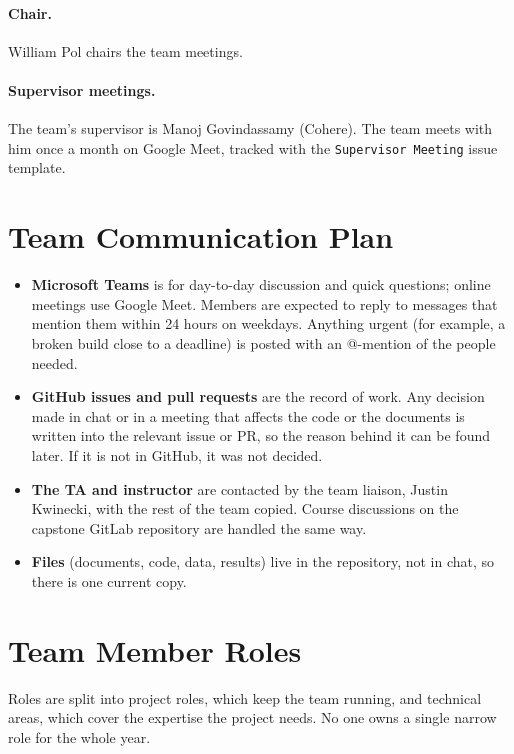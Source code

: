 \documentclass{article}
\begin{document}
\paragraph{Chair.} William Pol chairs the team meetings.

\paragraph{Supervisor meetings.} The team's supervisor is Manoj
Govindassamy (Cohere). The team meets with him once a month on Google
Meet, tracked with the \texttt{Supervisor Meeting} issue template.

\section{Team Communication Plan}

\begin{itemize}
  \item \textbf{Microsoft Teams} is for day-to-day discussion and quick
  questions; online meetings use Google Meet. Members are expected to reply to
  messages that mention them within 24 hours on weekdays. Anything urgent
  (for example, a broken build close to a deadline) is posted with an
  @-mention of the people needed.
  \item \textbf{GitHub issues and pull requests} are the record of work.
  Any decision made in chat or in a meeting that affects the code or the
  documents is written into the relevant issue or PR, so the reason
  behind it can be found later. If it is not in GitHub, it was not
  decided.
  \item \textbf{The TA and instructor} are contacted by the team liaison,
  Justin Kwinecki, with the rest of the team copied. Course discussions on
  the capstone GitLab repository are handled the same way.
  \item \textbf{Files} (documents, code, data, results) live in the
  repository, not in chat, so there is one current copy.
\end{itemize}

\section{Team Member Roles}
\label{sec:roles}

Roles are split into project roles, which keep the team running, and
technical areas, which cover the expertise the project needs. No one owns a
single narrow role for the whole year.
\end{document}
